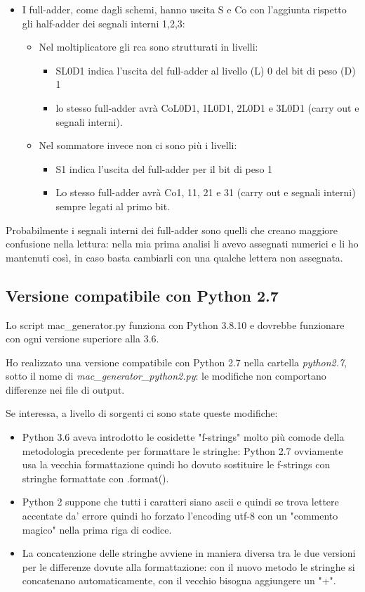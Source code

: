 \documentclass[12pt, letterpaper]{article}
\begin{document}
\begin{itemize}
\begin{itemize}
\item I full-adder, come dagli schemi, hanno uscita S e Co con l'aggiunta rispetto gli half-adder dei segnali interni 1,2,3:
\begin{itemize}
\item Nel moltiplicatore gli rca sono strutturati in livelli: 
\begin{itemize}
\item SL0D1 indica l'uscita del full-adder al livello (L) 0 del bit di peso (D) 1
\item lo stesso full-adder avrà CoL0D1, 1L0D1, 2L0D1 e 3L0D1 (carry out e segnali interni).
\end{itemize}
\item Nel sommatore invece non ci sono più i livelli: 
\begin{itemize}
\item S1 indica l'uscita del full-adder per il bit di peso 1
\item Lo stesso full-adder avrà Co1, 11, 21 e 31 (carry out e segnali interni) sempre legati al primo bit.
\end{itemize}
\end{itemize}
\end{itemize}
\end{itemize}

Probabilmente i segnali interni dei full-adder sono quelli che creano maggiore confusione nella lettura: nella mia prima analisi li avevo assegnati numerici e li ho mantenuti così, in caso basta cambiarli con una qualche lettera non assegnata.

\subsection{Versione compatibile con Python 2.7}

Lo script mac\_generator.py funziona con Python 3.8.10 e dovrebbe funzionare con ogni versione superiore alla 3.6.

Ho realizzato una versione compatibile con Python 2.7 nella cartella \textit{python2.7}, sotto il nome di \textit{mac\_generator\_python2.py}: le modifiche non comportano differenze nei file di output.

Se interessa, a livello di sorgenti ci sono state queste modifiche:
\begin{itemize}
\item Python 3.6 aveva introdotto le cosidette "f-strings" molto più comode della metodologia precedente per formattare le stringhe: Python 2.7 ovviamente usa la vecchia formattazione quindi ho dovuto sostituire le f-strings con stringhe formattate con .format().
\item Python 2 suppone che tutti i caratteri siano ascii e quindi se trova lettere accentate da' errore quindi ho forzato l'encoding utf-8 con un "commento magico" nella prima riga di codice.
\item La concatenzione delle stringhe avviene in maniera diversa tra le due versioni per le differenze dovute alla formattazione: con il nuovo metodo le stringhe si concatenano automaticamente, con il vecchio bisogna aggiungere un "+".
\end{itemize}
\end{document}
